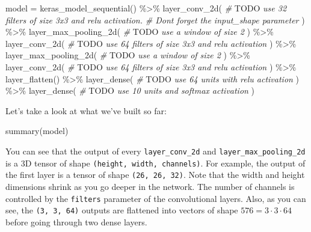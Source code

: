\documentclass[
  a4paper,
]{article}
\newenvironment{Shaded}{\begin{snugshade}}{\end{snugshade}}
\newcommand{\AlertTok}[1]{\textcolor[rgb]{0.94,0.16,0.16}{#1}}
\newcommand{\CommentTok}[1]{\textcolor[rgb]{0.56,0.35,0.01}{\textit{#1}}}
\newcommand{\FunctionTok}[1]{\textcolor[rgb]{0.00,0.00,0.00}{#1}}
\newcommand{\NormalTok}[1]{#1}
\newcommand{\OtherTok}[1]{\textcolor[rgb]{0.56,0.35,0.01}{#1}}
\newcommand{\SpecialCharTok}[1]{\textcolor[rgb]{0.00,0.00,0.00}{#1}}
\begin{document}
\begin{Shaded}
\begin{Highlighting}[]
\NormalTok{model }\OtherTok{=} \FunctionTok{keras\_model\_sequential}\NormalTok{() }\SpecialCharTok{\%\textgreater{}\%}
  \FunctionTok{layer\_conv\_2d}\NormalTok{(}
    \CommentTok{\# }\AlertTok{TODO}\CommentTok{ use 32 filters of size 3x3 and relu activation.}
    \CommentTok{\# Don\textquotesingle{}t forget the \textasciigrave{}input\_shape\textasciigrave{} parameter}
\NormalTok{  ) }\SpecialCharTok{\%\textgreater{}\%}
  \FunctionTok{layer\_max\_pooling\_2d}\NormalTok{(}
    \CommentTok{\# }\AlertTok{TODO}\CommentTok{ use a window of size 2}
\NormalTok{  ) }\SpecialCharTok{\%\textgreater{}\%}
  \FunctionTok{layer\_conv\_2d}\NormalTok{(}
    \CommentTok{\# }\AlertTok{TODO}\CommentTok{ use 64 filters of size 3x3 and relu activation}
\NormalTok{  ) }\SpecialCharTok{\%\textgreater{}\%}
  \FunctionTok{layer\_max\_pooling\_2d}\NormalTok{(}
    \CommentTok{\# }\AlertTok{TODO}\CommentTok{ use a window of size 2}
\NormalTok{  ) }\SpecialCharTok{\%\textgreater{}\%}
  \FunctionTok{layer\_conv\_2d}\NormalTok{(}
    \CommentTok{\# }\AlertTok{TODO}\CommentTok{ use 64 filters of size 3x3 and relu activation}
\NormalTok{  ) }\SpecialCharTok{\%\textgreater{}\%}
  \FunctionTok{layer\_flatten}\NormalTok{() }\SpecialCharTok{\%\textgreater{}\%}
  \FunctionTok{layer\_dense}\NormalTok{(}
    \CommentTok{\# }\AlertTok{TODO}\CommentTok{ use 64 units with relu activation}
\NormalTok{  ) }\SpecialCharTok{\%\textgreater{}\%}
  \FunctionTok{layer\_dense}\NormalTok{(}
    \CommentTok{\# }\AlertTok{TODO}\CommentTok{ use 10 units and softmax activation}
\NormalTok{  )}
\end{Highlighting}
\end{Shaded}

Let's take a look at what we've built so far:

\begin{Shaded}
\begin{Highlighting}[]
\FunctionTok{summary}\NormalTok{(model)}
\end{Highlighting}
\end{Shaded}

You can see that the output of every \texttt{layer\_conv\_2d} and
\texttt{layer\_max\_pooling\_2d} is a 3D tensor of shape
\texttt{(height,\ width,\ channels)}. For example, the output of the
first layer is a tensor of shape \texttt{(26,\ 26,\ 32)}. Note that the
width and height dimensions shrink as you go deeper in the network. The
number of channels is controlled by the \texttt{filters} parameter of
the convolutional layers. Also, as you can see, the
\texttt{(3,\ 3,\ 64)} outputs are flattened into vectors of shape
\(576=3\cdot 3\cdot 64\) before going through two dense layers.
\end{document}
